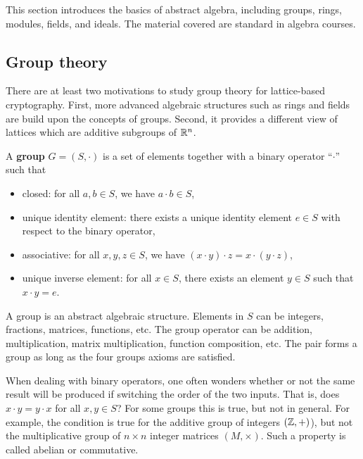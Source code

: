 \documentclass[../main.tex]{subfiles}
\begin{document}
\label{appen:abstract algebrac}

This section introduces the basics of abstract algebra, including groups, rings, modules, fields, and ideals.  %
The material covered are standard in algebra courses. 

\subsection{Group theory}
\label{subsection:group theory}
There are at least two motivations to study group theory for lattice-based cryptography. First, more advanced algebraic structures such as rings and fields are build upon the concepts of groups. Second, it provides a different view of lattices which are additive subgroups of $\mathbb{R}^n$. 

\begin{definition}
A \textbf{group} $G=(S,\cdot)$ \reversemarginpar
{}
is a set of elements together with a binary operator ``$\cdot$'' such that 
\begin{itemize}
    \item closed: for all $a,b \in S$, we have $a \cdot b \in S$,
    \item unique identity element: there exists a unique identity element $e \in S$ with respect to the binary operator,
    \item associative: for all $x, y, z \in S$, we have $(x\cdot y) \cdot z = x \cdot (y \cdot z)$,
    \item unique inverse element: for all $x \in S$, there exists an element $y \in S$ such that $x \cdot y = e$. %
\end{itemize}
\end{definition}
A group is an abstract algebraic structure. Elements in $S$ can be integers, fractions, matrices, functions, etc. The group operator can be addition, multiplication, matrix multiplication, function composition, etc. The pair forms a group as long as the four groups axioms are satisfied. 

When dealing with binary operators, one often wonders whether or not the same result will be produced if switching the order of the two inputs. That is, does $x \cdot y = y \cdot x$ for all $x, y \in S$? For some groups this is true, but not in general. For example, the condition is true for the additive group of integers $(\mathbb{Z}, +)$), but not the multiplicative group of $n \times n$ integer matrices $(M, \times)$. Such a property is called abelian or commutative. 
\end{document}
